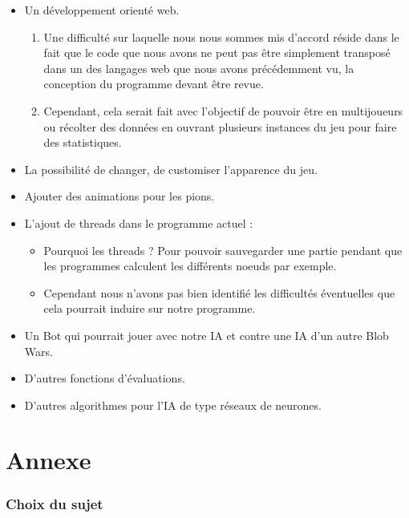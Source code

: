 \documentclass[11pt,a4paper]{article}
\begin{document}
    \begin{itemize}
        \item Un développement orienté web.
            \begin{enumerate}
                \item Une difficulté sur laquelle nous nous sommes mis d'accord réside dans le fait que le code que nous avons ne peut pas être simplement transposé dans un des langages web que nous avons précédemment vu, la conception du programme devant être revue.
                \item Cependant, cela serait fait avec l'objectif de pouvoir être en multijoueurs ou récolter des données en ouvrant plusieurs instances du jeu pour faire des statistiques.
            \end{enumerate}
        \item La possibilité de changer, de customiser l'apparence du jeu.
        \item Ajouter des animations pour les pions.
        \item L'ajout de threads dans le programme actuel :
            \begin{itemize}
                \item Pourquoi les threads ? Pour pouvoir sauvegarder une partie pendant que les programmes calculent les différents noeuds par exemple.
                \item Cependant nous n'avons pas bien identifié les difficultés éventuelles que cela pourrait induire sur notre programme.
            \end{itemize}
        \item Un Bot qui pourrait jouer avec notre IA et contre une IA d'un autre Blob Wars.
        \item D'autres fonctions d'évaluations.
        \item D'autres algorithmes pour l'IA de type réseaux de neurones.
    \end{itemize}
    
\newpage

\part{Annexe}

\setcounter{section}{0}

\section{Choix du sujet}
\end{document}
